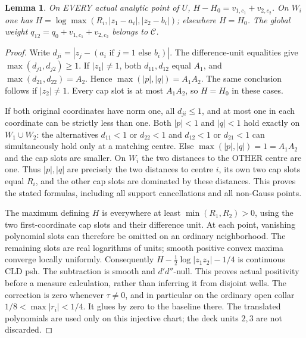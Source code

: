 \documentclass[11pt]{article}
\newtheorem{lemma}[theorem]{Lemma}
\newcommand{\DD}{d'd''}
\newcommand{\C}{\mathcal C}
\begin{document}
\begin{lemma}\label{slots}
On EVERY actual analytic point of $U$,
$H-H_0=v_{1,c_1}+v_{2,c_2}$. On $W_i$ one has
$H=\log\max(R_i,|z_1-a_i|,|z_2-b_i|)$; elsewhere $H=H_0$.
The global weight $q_{12}=q_0+v_{1,c_1}+v_{2,c_2}$ belongs to $\C$.
\end{lemma}
\begin{proof}
Write $d_{ji}=|z_j-(a_i\text{ if }j=1\text{ else }b_i)|$.
The difference-unit equalities give $\max(d_{j1},d_{j2})\ge1$.
If $|z_1|\ne1$, both $d_{11},d_{12}$ equal $A_1$, and
$\max(d_{21},d_{22})=A_2$. Hence $\max(|p|,|q|)=A_1A_2$.
The same conclusion follows if $|z_2|\ne1$. Every cap slot is at most
$A_1A_2$, so $H=H_0$ in these cases.

If both original coordinates have norm one, all $d_{ji}\le1$, and
at most one in each coordinate can be strictly less than one.
Both $|p|<1$ and $|q|<1$ hold exactly on $W_1\cup W_2$:
the alternatives $d_{11}<1$ or $d_{22}<1$ and $d_{12}<1$ or
$d_{21}<1$ can simultaneously hold only at a matching centre.
Else $\max(|p|,|q|)=1=A_1A_2$ and the cap slots are smaller.
On $W_i$ the two distances to the OTHER centre are one.
Thus $|p|,|q|$ are precisely the two distances to centre $i$,
its own two cap slots equal $R_i$, and the other cap slots are
dominated by these distances. This proves the stated formulas, including
all support cancellations and all non-Gauss points.

The maximum defining $H$ is everywhere at least $\min(R_1,R_2)>0$,
using the two first-coordinate cap slots and their difference unit.
At each point, vanishing polynomial slots can therefore be omitted on
an ordinary neighborhood. The remaining slots are real logarithms of
units; smooth positive convex maxima converge locally uniformly.
Consequently $H-\tfrac12\log|z_1z_2|-1/4$ is continuous CLD psh.
The subtraction is smooth and $\DD$-null. This proves actual positivity
before a measure calculation, rather than inferring it from disjoint wells.
The correction is zero whenever $\tau\ne0$, and in particular on the
ordinary open collar $1/8<\max|r_i|<1/4$. It glues by zero to the
baseline there. The translated polynomials are used only on this
injective chart; the deck units $2,3$ are not discarded.
\end{proof}
\end{document}
